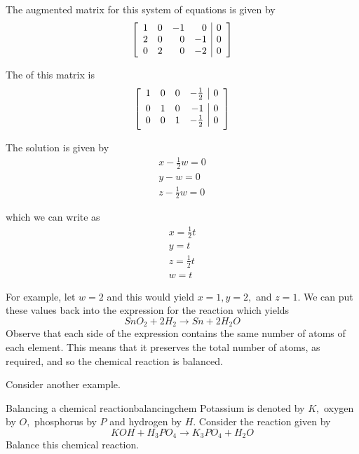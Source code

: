 The augmented matrix for this system of equations is given by 
\begin{equation*}
\left[ 
\begin{array}{rrrr|r}
1 & 0 & -1 & 0 & 0 \\ 
2 & 0 & 0 & -1 & 0 \\ 
0 & 2 & 0 & -2 & 0
\end{array}
\right]
\end{equation*}

The {\rref} of this matrix is 
\begin{equation*}
\leftB
\begin{array}{rrrr|r}
1 & 0 & 0 & -\vspace{0.05in}\frac{1}{2} & 0 \\ 
0 & 1 & 0 & -1 & 0 \\ 
0 & 0 & 1 & -\vspace{0.05in}\frac{1}{2} & 0
\end{array}
\rightB
\end{equation*}

The solution is given by 
\begin{equation*}
\begin{array}{c}
x - \frac{1}{2} w = 0 \\
y - w = 0 \\
z - \frac{1}{2}w = 0
\end{array}
\end{equation*} 

which we can write as 
\begin{equation*}
\begin{array}{c}
x = \frac{1}{2} t \\
y = t \\
z = \frac{1}{2}t \\
w = t
\end{array}
\end{equation*}

For example, let $w=2$ and this would yield $x=1,y=2,$ and $z=1.$ We can put these values back into 
the expression for the reaction which yields 
\begin{equation*}
SnO_{2}+2H_{2}\rightarrow Sn+2H_{2}O
\end{equation*}
Observe that each side of the expression contains the same number of atoms of each element. This means that 
it preserves the total number of atoms, as required, and so the chemical
reaction is balanced. 

Consider another example.

\begin{example}{Balancing a chemical reaction}{balancingchem}
Potassium is denoted by $K,$ oxygen by $O,$
phosphorus by $P$ and hydrogen by $H$. 
Consider the reaction given by
\begin{equation*}
KOH+H_{3}PO_{4}\rightarrow K_{3}PO_{4}+H_{2}O
\end{equation*}
Balance this chemical reaction.
\end{example}

